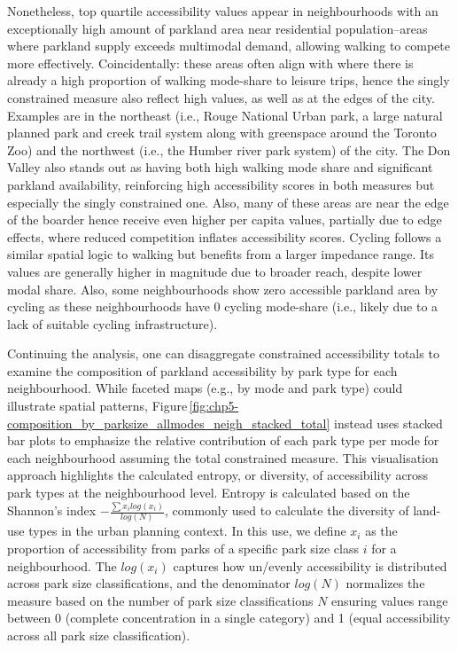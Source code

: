 \documentclass[
11pt, %
oneside, %
english, %
singlespacing, %
]{macthesis} %
\begin{document}
Nonetheless, top quartile accessibility values appear in neighbourhoods with an exceptionally high amount of parkland area near residential population--areas where parkland supply exceeds multimodal demand, allowing walking to compete more effectively. Coincidentally: these areas often align with where there is already a high proportion of walking mode-share to leisure trips, hence the singly constrained measure also reflect high values, as well as at the edges of the city. Examples are in the northeast (i.e., Rouge National Urban park, a large natural planned park and creek trail system along with greenspace around the Toronto Zoo) and the northwest (i.e., the Humber river park system) of the city. The Don Valley also stands out as having both high walking mode share and significant parkland availability, reinforcing high accessibility scores in both measures but especially the singly constrained one. Also, many of these areas are near the edge of the boarder hence receive even higher per capita values, partially due to edge effects, where reduced competition inflates accessibility scores. Cycling follows a similar spatial logic to walking but benefits from a larger impedance range. Its values are generally higher in magnitude due to broader reach, despite lower modal share. Also, some neighbourhoods show zero accessible parkland area by cycling as these neighbourhoods have 0 cycling mode-share (i.e., likely due to a lack of suitable cycling infrastructure).

Continuing the analysis, one can disaggregate constrained accessibility totals to examine the composition of parkland accessibility by park type for each neighbourhood. While faceted maps (e.g., by mode and park type) could illustrate spatial patterns, Figure\,\ref{fig:chp5-composition_by_parksize_allmodes_neigh_stacked_total} instead uses stacked bar plots to emphasize the relative contribution of each park type per mode for each neighbourhood assuming the total constrained measure. This visualisation approach highlights the calculated entropy, or diversity, of accessibility across park types at the neighbourhood level. Entropy is calculated based on the Shannon's index \(-\frac{\sum x_ilog(x_i)}{log(N)}\), commonly used to calculate the diversity of land-use types in the urban planning context. In this use, we define \(x_i\) as the proportion of accessibility from parks of a specific park size class \(i\) for a neighbourhood. The \(log(x_i)\) captures how un/evenly accessibility is distributed across park size classifications, and the denominator \(log(N)\) normalizes the measure based on the number of park size classifications \(N\) ensuring values range between 0 (complete concentration in a single category) and 1 (equal accessibility across all park size classification).
\end{document}
